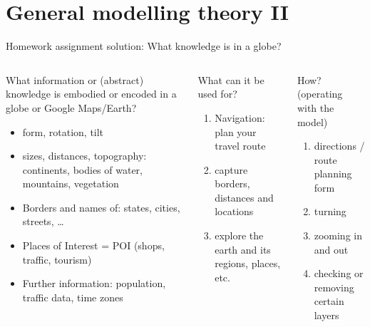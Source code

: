 \section{General modelling theory II}
\begin{frame}{Homework assignment solution: What knowledge is in a globe?}
\begin{columns}[T,onlytextwidth]
\begin{exampleblock}{\footnotesize What information or (abstract) knowledge is embodied or encoded in a globe or Google Maps/Earth? }
    \begin{itemize}\footnotesize
        \item form, rotation, tilt
        \item sizes, distances, topography: continents, bodies of water, mountains, vegetation 
        \item Borders and names of: states, cities, streets, \dots
        \item Places of Interest = POI (shops, traffic, tourism)
        \item Further information: population, traffic data, time zones
    \end{itemize}
\end{exampleblock}

\begin{alertblock}{What can it be used for?}
\begin{enumerate}\small
    \item Navigation: plan your travel route
    \item capture borders, distances and locations
    \item explore the earth and its regions, places, etc.
\end{enumerate}
\end{alertblock}

\begin{alertblock}{How? (operating with the model)}
\begin{enumerate}\small
    \item directions / route planning form
    \item turning
    \item zooming in and out
    \item checking or removing certain layers
\end{enumerate}
\end{alertblock}
\end{columns}
\end{frame}

